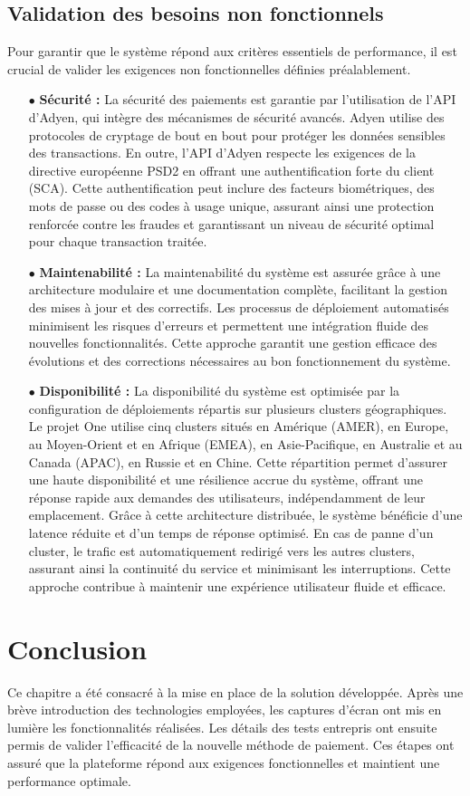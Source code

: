 \subsection{Validation des besoins non fonctionnels}
Pour garantir que le système répond aux critères essentiels de performance, il est crucial de valider les exigences non fonctionnelles définies préalablement.
\begin{itemize}
    \item[$\bullet$]\textbf{Sécurité :} La sécurité des paiements est garantie par l'utilisation de l'API d'Adyen, qui intègre des mécanismes de sécurité avancés. Adyen utilise des protocoles de cryptage de bout en bout pour protéger les données sensibles des transactions. En outre, l'API d'Adyen respecte les exigences de la directive européenne PSD2 en offrant une authentification forte du client (SCA). Cette authentification peut inclure des facteurs biométriques, des mots de passe ou des codes à usage unique, assurant ainsi une protection renforcée contre les fraudes et garantissant un niveau de sécurité optimal pour chaque transaction traitée.
    \item[$\bullet$] \textbf{Maintenabilité :} La maintenabilité du système est assurée grâce à une architecture modulaire et une documentation complète, facilitant la gestion des mises à jour et des correctifs. Les processus de déploiement automatisés minimisent les risques d'erreurs et permettent une intégration fluide des nouvelles fonctionnalités. Cette approche garantit une gestion efficace des évolutions et des corrections nécessaires au bon fonctionnement du système.
    \item[$\bullet$] \textbf{Disponibilité :} La disponibilité du système est optimisée par la configuration de déploiements répartis sur plusieurs clusters géographiques. Le projet One utilise cinq clusters situés en Amérique (AMER), en Europe, au Moyen-Orient et en Afrique (EMEA), en Asie-Pacifique, en Australie et au Canada (APAC), en Russie et en Chine. Cette répartition permet d'assurer une haute disponibilité et une résilience accrue du système, offrant une réponse rapide aux demandes des utilisateurs, indépendamment de leur emplacement. Grâce à cette architecture distribuée, le système bénéficie d'une latence réduite et d'un temps de réponse optimisé. En cas de panne d'un cluster, le trafic est automatiquement redirigé vers les autres clusters, assurant ainsi la continuité du service et minimisant les interruptions. Cette approche contribue à maintenir une expérience utilisateur fluide et efficace.
\end{itemize}

\section*{Conclusion}
Ce chapitre a été consacré à la mise en place de la solution développée. Après une brève introduction des technologies employées, les captures d'écran ont mis en lumière les fonctionnalités réalisées. Les détails des tests entrepris ont ensuite permis de valider l'efficacité de la nouvelle méthode de paiement. Ces étapes ont assuré que la plateforme répond aux exigences fonctionnelles et maintient une performance optimale.


